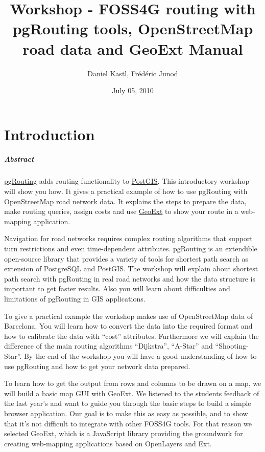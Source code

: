 \documentclass[a4paper,10pt,english]{manual}
\title{Workshop - FOSS4G routing with pgRouting tools, OpenStreetMap road data and GeoExt Manual}
\date{July 05, 2010}
\author{Daniel Kastl, Frédéric Junod}
\begin{document}
\maketitle
\tableofcontents
\hypertarget{--doc-latex}{}


\resetcurrentobjects
\hypertarget{--doc-chapters/introduction}{}

\chapter{Introduction}
\paragraph{Abstract}

\href{http://www.pgrouting.org}{pgRouting} adds routing functionality to \href{http://www.postgis.org}{PostGIS}. This introductory workshop will show you how. It gives a practical example of how to use pgRouting with \href{http://www.openstreetmap.org}{OpenStreetMap} road network data. It explains the steps to prepare the data, make routing queries, assign costs and use \href{http://www.geoext.org}{GeoExt} to show your route in a web-mapping application.

Navigation for road networks requires complex routing algorithms that support turn restrictions and even time-dependent attributes. pgRouting is an extendible open-source library that provides a variety of tools for shortest path search as extension of PostgreSQL and PostGIS. The workshop will explain about shortest path search with pgRouting in real road networks and how the data structure is important to get faster results. Also you will learn about difficulties and limitations of pgRouting in GIS applications.

To give a practical example the workshop makes use of OpenStreetMap data of Barcelona. You will learn how to convert the data into the required format and how to calibrate the data with ``cost'' attributes. Furthermore we will explain the difference of the main routing algorithms ``Dijkstra'', ``A-Star'' and ``Shooting-Star''. By the end of the workshop you will have a good understanding of how to use pgRouting and how to get your network data prepared.

To learn how to get the output from rows and columns to be drawn on a map, we will build a basic map GUI with GeoExt. We listened to the students feedback of the last year's and want to guide you through the basic steps to build a simple browser application. Our goal is to make this as easy as possible, and to show that it's not difficult to integrate with other FOSS4G tools. For that reason we selected GeoExt, which is a JavaScript library providing the groundwork for creating web-mapping applications based on OpenLayers and Ext.
\end{document}
